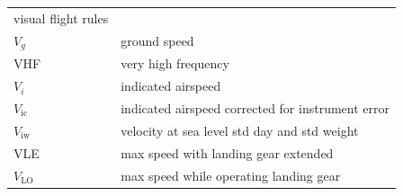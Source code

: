 \documentclass[
]{book}
\begin{document}
\begin{longtable}[]{@{}ll@{}}
\begin{minipage}[t]{0.47\columnwidth}
visual flight rules\strut
\end{minipage}\tabularnewline
\begin{minipage}[t]{0.47\columnwidth}\raggedright
\(V_g\)\strut
\end{minipage} & \begin{minipage}[t]{0.47\columnwidth}\raggedright
ground speed\strut
\end{minipage}\tabularnewline
\begin{minipage}[t]{0.47\columnwidth}\raggedright
VHF\strut
\end{minipage} & \begin{minipage}[t]{0.47\columnwidth}\raggedright
very high frequency\strut
\end{minipage}\tabularnewline
\begin{minipage}[t]{0.47\columnwidth}\raggedright
\(V_i\)\strut
\end{minipage} & \begin{minipage}[t]{0.47\columnwidth}\raggedright
indicated airspeed\strut
\end{minipage}\tabularnewline
\begin{minipage}[t]{0.47\columnwidth}\raggedright
\(V_{\mathrm{ic}}\)\strut
\end{minipage} & \begin{minipage}[t]{0.47\columnwidth}\raggedright
indicated airspeed corrected for instrument error\strut
\end{minipage}\tabularnewline
\begin{minipage}[t]{0.47\columnwidth}\raggedright
\(V_{\mathrm{iw}}\)\strut
\end{minipage} & \begin{minipage}[t]{0.47\columnwidth}\raggedright
velocity at sea level std day and std weight\strut
\end{minipage}\tabularnewline
\begin{minipage}[t]{0.47\columnwidth}\raggedright
VLE\strut
\end{minipage} & \begin{minipage}[t]{0.47\columnwidth}\raggedright
max speed with landing gear extended\strut
\end{minipage}\tabularnewline
\begin{minipage}[t]{0.47\columnwidth}\raggedright
\(V_{\mathrm{LO}}\)\strut
\end{minipage} & \begin{minipage}[t]{0.47\columnwidth}\raggedright
max speed while operating landing gear\strut
\end{minipage}\tabularnewline

\end{longtable}
\end{document}
